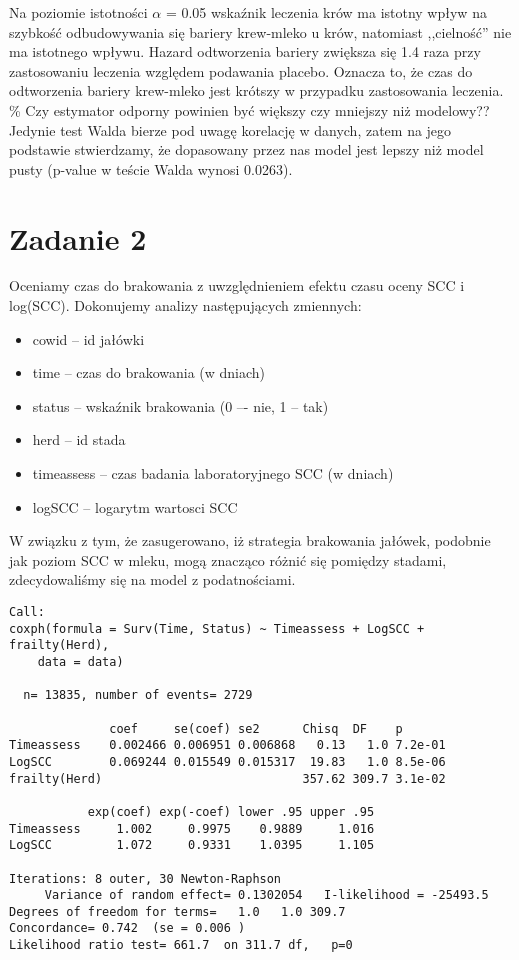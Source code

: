 \documentclass[]{article}
\begin{document}
Na poziomie istotności $\alpha$ = 0.05 wskaźnik leczenia krów ma istotny
wpływ na szybkość odbudowywania się bariery krew-mleko u krów, natomiast
,,cielność'' nie ma istotnego wpływu. Hazard odtworzenia bariery
zwiększa się 1.4 raza przy zastosowaniu leczenia względem podawania
placebo. Oznacza to, że czas do odtworzenia bariery krew-mleko jest
krótszy w przypadku zastosowania leczenia. \% Czy estymator odporny
powinien być większy czy mniejszy niż modelowy?? Jedynie test Walda
bierze pod uwagę korelację w danych, zatem na jego podstawie
stwierdzamy, że dopasowany przez nas model jest lepszy niż model pusty
(p-value w teście Walda wynosi 0.0263).

\section{Zadanie 2}

Oceniamy czas do brakowania z uwzględnieniem efektu czasu oceny SCC i
log(SCC). Dokonujemy analizy następujących zmiennych:

\begin{itemize}
\item cowid -- id jałówki
\item time -- czas do brakowania (w dniach)
\item status -- wskaźnik brakowania (0 –- nie, 1 -- tak)
\item herd -- id stada
\item timeassess -- czas badania laboratoryjnego SCC (w dniach)
\item logSCC -- logarytm wartosci SCC
\end{itemize}

W związku z tym, że zasugerowano, iż strategia brakowania jałówek,
podobnie jak poziom SCC w mleku, mogą znacząco różnić się pomiędzy
stadami, zdecydowaliśmy się na model z podatnościami.

\begin{verbatim}
Call:
coxph(formula = Surv(Time, Status) ~ Timeassess + LogSCC + frailty(Herd), 
    data = data)

  n= 13835, number of events= 2729 

              coef     se(coef) se2      Chisq  DF    p      
Timeassess    0.002466 0.006951 0.006868   0.13   1.0 7.2e-01
LogSCC        0.069244 0.015549 0.015317  19.83   1.0 8.5e-06
frailty(Herd)                            357.62 309.7 3.1e-02

           exp(coef) exp(-coef) lower .95 upper .95
Timeassess     1.002     0.9975    0.9889     1.016
LogSCC         1.072     0.9331    1.0395     1.105

Iterations: 8 outer, 30 Newton-Raphson
     Variance of random effect= 0.1302054   I-likelihood = -25493.5 
Degrees of freedom for terms=   1.0   1.0 309.7 
Concordance= 0.742  (se = 0.006 )
Likelihood ratio test= 661.7  on 311.7 df,   p=0
\end{verbatim}
\end{document}
